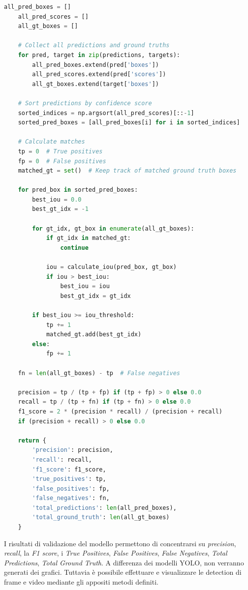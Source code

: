 \documentclass[12pt]{article}
\begin{document}
\begin{lstlisting}[language=Python, caption={Esempio di codice per la validazione del modello Resnet}, label={lst:valid-resnet}]
    all_pred_boxes = []
    all_pred_scores = []
    all_gt_boxes = []
    
    # Collect all predictions and ground truths
    for pred, target in zip(predictions, targets):
        all_pred_boxes.extend(pred['boxes'])
        all_pred_scores.extend(pred['scores'])
        all_gt_boxes.extend(target['boxes'])
    
    # Sort predictions by confidence score
    sorted_indices = np.argsort(all_pred_scores)[::-1]
    sorted_pred_boxes = [all_pred_boxes[i] for i in sorted_indices]
    
    # Calculate matches
    tp = 0  # True positives
    fp = 0  # False positives
    matched_gt = set()  # Keep track of matched ground truth boxes
    
    for pred_box in sorted_pred_boxes:
        best_iou = 0.0
        best_gt_idx = -1
        
        for gt_idx, gt_box in enumerate(all_gt_boxes):
            if gt_idx in matched_gt:
                continue
            
            iou = calculate_iou(pred_box, gt_box)
            if iou > best_iou:
                best_iou = iou
                best_gt_idx = gt_idx
        
        if best_iou >= iou_threshold:
            tp += 1
            matched_gt.add(best_gt_idx)
        else:
            fp += 1
    
    fn = len(all_gt_boxes) - tp  # False negatives

    precision = tp / (tp + fp) if (tp + fp) > 0 else 0.0
    recall = tp / (tp + fn) if (tp + fn) > 0 else 0.0
    f1_score = 2 * (precision * recall) / (precision + recall) 
    if (precision + recall) > 0 else 0.0
    
    return {
        'precision': precision,
        'recall': recall,
        'f1_score': f1_score,
        'true_positives': tp,
        'false_positives': fp,
        'false_negatives': fn,
        'total_predictions': len(all_pred_boxes),
        'total_ground_truth': len(all_gt_boxes)
    }
\end{lstlisting}
I risultati di validazione del modello permettono di concentrarsi su \textit{precision}, \textit{recall}, la \textit{F1 score}, i \textit{True Positives}, \textit{False Positives}, \textit{False Negatives}, \textit{Total Predictions}, \textit{Total Ground Truth}. A differenza dei modelli YOLO, non verranno generati dei grafici. Tuttavia è possibile effettuare e visualizzare le detection di frame e video mediante gli appositi metodi definiti.
\end{document}
